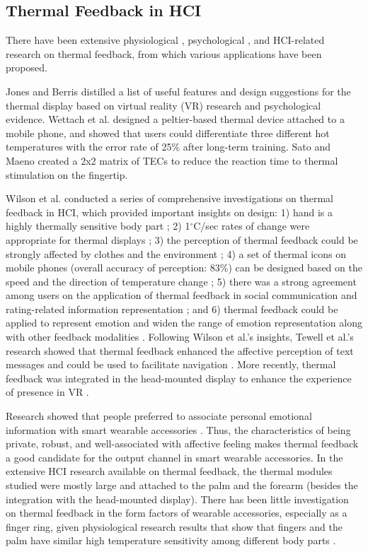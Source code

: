 \documentclass[preprint,12pt]{elsarticle}
\begin{document}
\subsection{Thermal Feedback in HCI}
There have been extensive physiological \cite{1,31,33}, psychological \cite{14,27,45}, and HCI-related \cite{8,9,10,15,26,36,37,38,39,40,41} research on thermal feedback, from which various applications have been proposed.

Jones and Berris \cite{14} distilled a list of useful features and design suggestions for the thermal display based on virtual reality (VR) research and psychological evidence. Wettach et al. \cite{36} designed a peltier-based thermal device attached to a mobile phone, and showed that users could differentiate three different hot temperatures with the error rate of 25\% after long-term training. Sato and Maeno \cite{26} created a 2x2 matrix of TECs to reduce the reaction time to thermal stimulation on the fingertip.

Wilson et al. conducted a series of comprehensive investigations on thermal feedback in HCI, which provided important insights on design: 1) hand is a highly thermally sensitive body part \cite{10}; 2) 1$^{\circ}$C/sec rates of change were appropriate for thermal displays \cite{42}; 3) the perception of thermal feedback could be strongly affected by clothes \cite{10} and the environment \cite{8}; 4) a set of thermal icons on mobile phones (overall accuracy of perception: 83\%) can be designed based on the speed and the direction of temperature change \cite{38}; 5) there was a strong agreement among users on the application of thermal feedback in social communication and rating-related information representation \cite{40}; and 6) thermal feedback could be applied to represent emotion \cite{41} and widen the range of emotion representation along with other feedback modalities \cite{37}. Following Wilson et al.'s insights, Tewell et al.'s research showed that thermal feedback enhanced the affective perception of text messages \cite{35} and could be used to facilitate navigation \cite{34}. More recently, thermal feedback was integrated in the head-mounted display to enhance the experience of presence in VR \cite{19,20,23}.

Research showed that people preferred to associate personal emotional information with smart wearable accessories \cite{21}. Thus, the characteristics of being private, robust, and well-associated with affective feeling makes thermal feedback a good candidate for the output channel in smart wearable accessories. In the extensive HCI research available on thermal feedback, the thermal modules studied were mostly large and attached to the palm and the forearm (besides the integration with the head-mounted display). There has been little investigation on thermal feedback in the form factors of wearable accessories, especially as a finger ring, given physiological research results that show that fingers and the palm have similar high temperature sensitivity among different body parts \cite{31}.
\end{document}
